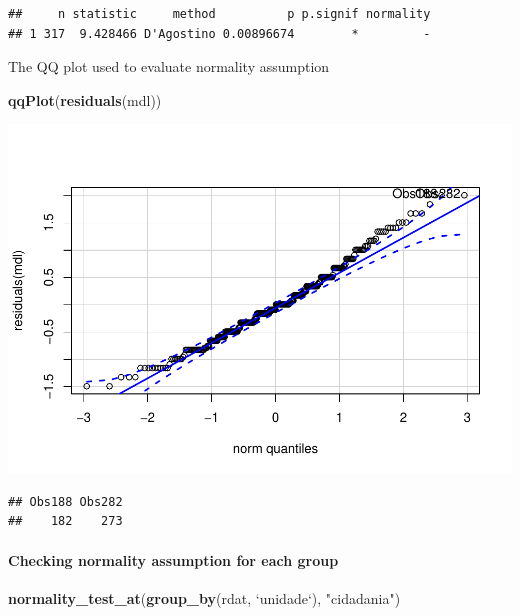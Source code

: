 \documentclass[]{article}
\newenvironment{Shaded}{\begin{snugshade}}{\end{snugshade}}
\newcommand{\DataTypeTok}[1]{\textcolor[rgb]{0.13,0.29,0.53}{#1}}
\newcommand{\KeywordTok}[1]{\textcolor[rgb]{0.13,0.29,0.53}{\textbf{#1}}}
\newcommand{\NormalTok}[1]{#1}
\newcommand{\StringTok}[1]{\textcolor[rgb]{0.31,0.60,0.02}{#1}}
\let\oldparagraph\paragraph
\renewcommand{\paragraph}[1]{\oldparagraph{#1}\mbox{}}
\begin{document}
\begin{verbatim}
##     n statistic     method          p p.signif normality
## 1 317  9.428466 D'Agostino 0.00896674        *         -
\end{verbatim}

The QQ plot used to evaluate normality assumption

\begin{Shaded}
\begin{Highlighting}[]
\KeywordTok{qqPlot}\NormalTok{(}\KeywordTok{residuals}\NormalTok{(mdl))}
\end{Highlighting}
\end{Shaded}

\includegraphics{factorialAnova_files/figure-latex/unnamed-chunk-7-1.pdf}

\begin{verbatim}
## Obs188 Obs282 
##    182    273
\end{verbatim}

\hypertarget{checking-normality-assumption-for-each-group}{%
\paragraph{Checking normality assumption for each
group}\label{checking-normality-assumption-for-each-group}}

\begin{Shaded}
\begin{Highlighting}[]
\KeywordTok{normality_test_at}\NormalTok{(}\KeywordTok{group_by}\NormalTok{(rdat, }\StringTok{`}\DataTypeTok{unidade}\StringTok{`}\NormalTok{), }\StringTok{"cidadania"}\NormalTok{)}
\end{Highlighting}
\end{Shaded}
\end{document}
